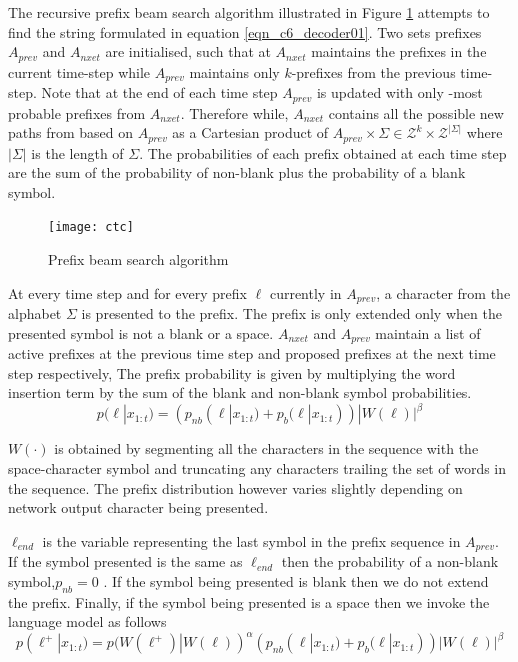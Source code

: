 The recursive prefix beam search algorithm illustrated in Figure \ref{fig_c6_decoder01} attempts to find the string formulated in equation \ref{eqn_c6_decoder01}.  Two sets prefixes $A_{prev}$ and $A_{nxet}$ are initialised, such that at $A_{nxet}$ maintains the prefixes in the current time-step while $A_{prev}$ maintains only $k$-prefixes from the previous time-step.  Note that at the end of each time step $A_{prev}$ is updated with only -most probable prefixes from $A_{nxet}$. Therefore while,  $A_{nxet}$ contains all the possible new paths from based on $A_{prev}$ as a Cartesian product of $A_{prev} \times \Sigma \in \mathcal{Z}^k\times\mathcal{Z}^{|\Sigma|}$ where $|\Sigma|$ is the length of $\Sigma$. The probabilities of each prefix obtained at each time step are the sum of the probability of non-blank plus the probability of a blank symbol.
\begin{figure}
    \texttt{[image: ctc]}
    \caption{Prefix beam search algorithm}
    \label{fig_c6_decoder01}
\end{figure}

At every  time step and for every prefix $\ell$ currently in $A_{prev}$, a character from the alphabet $\Sigma$ is presented to the prefix. The prefix is only extended only when the presented symbol is not a blank or a space. $A_{nxet}$ and $A_{prev}$ maintain a list of active prefixes at the previous time step and proposed prefixes at the next time step respectively, The prefix probability is given by multiplying the word insertion term by the sum of the blank and non-blank symbol probabilities.
\begin{equation}
p(\ell|x_{1:t})=(p_{nb}(\ell|x_{1:t})+p_b(\ell|x_{1:t}))|W(\ell)|^\beta
\label{eqn_c6_decoder03}
\end{equation}

$W(\cdot)$ is obtained by segmenting all the characters in the sequence with the space-character symbol and truncating any characters trailing the  set of words in the sequence.  The prefix distribution however varies slightly depending on network output character being presented.

$\ell_{end}$ is the variable representing the last symbol in the prefix sequence in $A_{prev}$. If the symbol presented is the same as $\ell_{end}$ then the probability of a non-blank symbol,$p_{nb}=0$ . If the symbol being presented is blank then we do not extend the prefix.  Finally, if the symbol being presented is a space then we invoke the language model as follows
\begin{equation}
p(\ell^+|x_{1:t})=p(W(\ell^+)|W(\ell))^\alpha(p_{nb}(\ell|x_{1:t})+p_b(\ell|x_{1:t}))|W(\ell)|^\beta
\label{eqn_c6_decoder03}
\end{equation}

